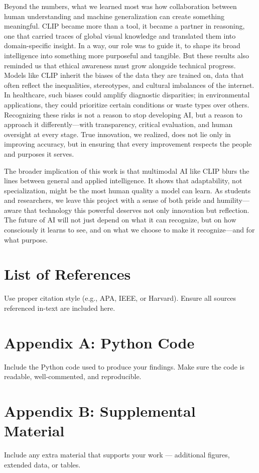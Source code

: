 \documentclass[12pt]{article}
\begin{document}
Beyond the numbers, what we learned most was how collaboration between human understanding and machine generalization can create something meaningful. CLIP became more than a tool, it became a partner in reasoning, one that carried traces of global visual knowledge and translated them into domain-specific insight. In a way, our role was to guide it, to shape its broad intelligence into something more purposeful and tangible.
But these results also reminded us that ethical awareness must grow alongside technical progress. Models like CLIP inherit the biases of the data they are trained on, data that often reflect the inequalities, stereotypes, and cultural imbalances of the internet. In healthcare, such biases could amplify diagnostic disparities; in environmental applications, they could prioritize certain conditions or waste types over others. Recognizing these risks is not a reason to stop developing AI, but a reason to approach it differently---with transparency, critical evaluation, and human oversight at every stage. True innovation, we realized, does not lie only in improving accuracy, but in ensuring that every improvement respects the people and purposes it serves.

The broader implication of this work is that multimodal AI like CLIP blurs the lines between general and applied intelligence. It shows that adaptability, not specialization, might be the most human quality a model can learn. As students and researchers, we leave this project with a sense of both pride and humility---aware that technology this powerful deserves not only innovation but reflection. The future of AI will not just depend on what it can recognize, but on how consciously it learns to see, and on what we choose to make it recognize---and for what purpose.

\newpage
\section*{List of References}
Use proper citation style (e.g., APA, IEEE, or Harvard).  
Ensure all sources referenced in-text are included here.

\appendix

\section{Appendix A: Python Code}
Include the Python code used to produce your findings.  
Make sure the code is readable, well-commented, and reproducible.

\section{Appendix B: Supplemental Material}
Include any extra material that supports your work — additional figures, extended data, or tables.
\end{document}
